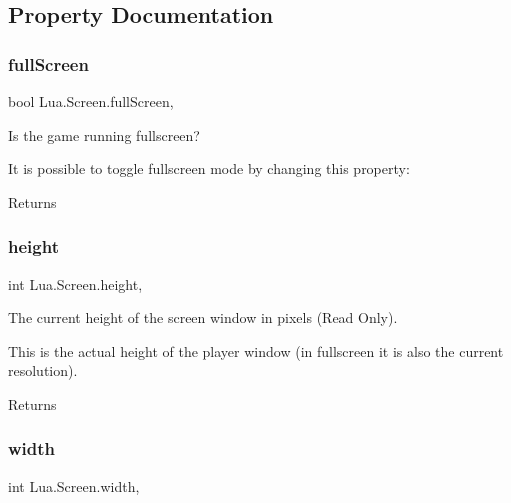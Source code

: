 \subsection{Property Documentation}
\mbox{\label{class_lua_1_1_screen_a7b08588981d36493e586b0d59a1f1b7a}} 
\subsubsection{\texorpdfstring{fullScreen}{fullScreen}}
{\footnotesize\ttfamily bool Lua.\+Screen.\+full\+Screen\hspace{0.3cm}{\ttfamily [static]}, {\ttfamily [get]}}



Is the game running fullscreen? 

It is possible to toggle fullscreen mode by changing this property\+: \begin{DoxyReturn}{Returns}

\end{DoxyReturn}
\mbox{\label{class_lua_1_1_screen_a7e3459d0ccc2641709d1bad599092fdc}} 
\subsubsection{\texorpdfstring{height}{height}}
{\footnotesize\ttfamily int Lua.\+Screen.\+height\hspace{0.3cm}{\ttfamily [static]}, {\ttfamily [get]}}



The current height of the screen window in pixels (Read Only). 

This is the actual height of the player window (in fullscreen it is also the current resolution). \begin{DoxyReturn}{Returns}

\end{DoxyReturn}
\mbox{\label{class_lua_1_1_screen_ae44386bf8759e8f85e04358297f3dd95}} 
\subsubsection{\texorpdfstring{width}{width}}
{\footnotesize\ttfamily int Lua.\+Screen.\+width\hspace{0.3cm}{\ttfamily [static]}, {\ttfamily [get]}}



